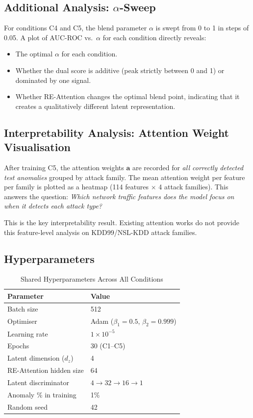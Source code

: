 \documentclass[12pt,a4paper]{article}
\begin{document}
\subsection{Additional Analysis: $\alpha$-Sweep}

For conditions C4 and C5, the blend parameter $\alpha$ is swept from 0 to 1 in
steps of 0.05. A plot of AUC-ROC vs.\ $\alpha$ for each condition directly
reveals:
\begin{itemize}[leftmargin=2em]
    \item The optimal $\alpha$ for each condition.
    \item Whether the dual score is additive (peak strictly between 0 and 1)
          or dominated by one signal.
    \item Whether RE-Attention changes the optimal blend point, indicating that
          it creates a qualitatively different latent representation.
\end{itemize}

\subsection{Interpretability Analysis: Attention Weight Visualisation}

After training C5, the attention weights $\mathbf{a}$ are recorded for
\emph{all correctly detected test anomalies} grouped by attack family. The
mean attention weight per feature per family is plotted as a heatmap
(114 features $\times$ 4 attack families). This answers the question:
\emph{Which network traffic features does the model focus on when it detects
each attack type?}

This is the key interpretability result. Existing attention works
\citep{vae_attention_lstm,attention_ae_latent} do not provide this feature-level
analysis on KDD99/NSL-KDD attack families.

\subsection{Hyperparameters}

\begin{table}[h!]
\centering
\caption{Shared Hyperparameters Across All Conditions}
\begin{tabular}{ll}
\toprule
\textbf{Parameter} & \textbf{Value} \\
\midrule
Batch size & 512 \\
Optimiser & Adam ($\beta_1 = 0.5$, $\beta_2 = 0.999$) \\
Learning rate & $1 \times 10^{-5}$ \\
Epochs & 30 (C1--C5) \\
Latent dimension ($d_z$) & 4 \\
RE-Attention hidden size & 64 \\
Latent discriminator & $4 \to 32 \to 16 \to 1$ \\
Anomaly \% in training & 1\% \\
Random seed & 42 \\
\bottomrule
\end{tabular}
\end{table}
\end{document}
